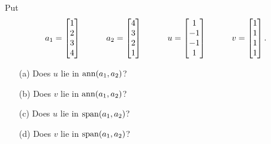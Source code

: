 \documentclass[a4paper]{amsart}
\begin{document}
\begin{exercise}\label{ex-check-ann-span}
 Put 
 \[ a_1 = \left[\begin{matrix} 1 \\ 2 \\ 3 \\ 4 \end{matrix}\right] \hspace{3em}
    a_2 = \left[\begin{matrix} 4 \\ 3 \\ 2 \\ 1 \end{matrix}\right] \hspace{3em}
    u = \left[\begin{matrix} 1 \\ -1 \\ -1 \\ 1 \end{matrix}\right] \hspace{3em}
    v = \left[\begin{matrix} 1 \\ 1 \\ 1 \\ 1 \end{matrix}\right].
 \]
 \begin{itemize}
  \item[(a)] Does $u$ lie in $\operatorname{ann}(a_1,a_2)$?
  \item[(b)] Does $v$ lie in $\operatorname{ann}(a_1,a_2)$?
  \item[(c)] Does $u$ lie in $\operatorname{span}(a_1,a_2)$?
  \item[(d)] Does $v$ lie in $\operatorname{span}(a_1,a_2)$?
 \end{itemize}
\end{exercise}
\end{document}
